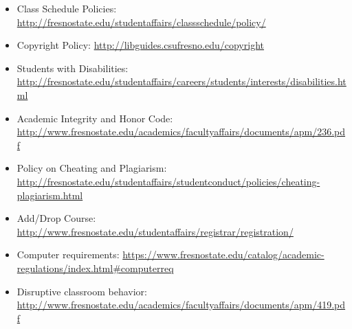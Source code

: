 \begin{itemize}
\tightlist
\item
  Class Schedule Policies:
  \url{http://fresnostate.edu/studentaffairs/classschedule/policy/}
\item
  Copyright Policy: \url{http://libguides.csufresno.edu/copyright}
\item
  Students with Disabilities:
  \url{http://fresnostate.edu/studentaffairs/careers/students/interests/disabilities.html}
\item
  Academic Integrity and Honor Code:
  \url{http://www.fresnostate.edu/academics/facultyaffairs/documents/apm/236.pdf}
\item
  Policy on Cheating and Plagiarism:
  \url{http://fresnostate.edu/studentaffairs/studentconduct/policies/cheating-plagiarism.html}
\item
  Add/Drop Course:
  \url{http://www.fresnostate.edu/studentaffairs/registrar/registration/}
\item
  Computer requirements:
  \url{https://www.fresnostate.edu/catalog/academic-regulations/index.html\#computerreq}
\item
  Disruptive classroom behavior:
  \url{http://www.fresnostate.edu/academics/facultyaffairs/documents/apm/419.pdf}
\end{itemize}

